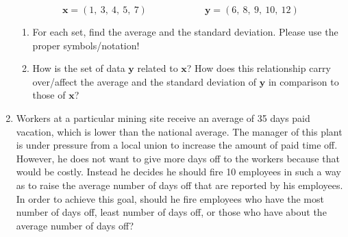 \documentclass[
  letterpaper,
  DIV=11,
  numbers=noendperiod]{scrartcl}
\begin{document}
\begin{enumerate}
  \[\mathbf{x} =  (1, \ 3,\ 4, \ 5,\  7) \qquad \qquad \qquad  \mathbf{y} =  (6,\ 8,\ 9,\ 10,\ 12)\]

  \begin{enumerate}
  \def\labelenumii{\alph{enumii}.}
  \item
    For each set, find the average and the standard deviation. Please
    use the proper symbols/notation!
  \item
    How is the set of data \(\mathbf{y}\) related to \(\mathbf{x}\)? How
    does this relationship carry over/affect the average and the
    standard deviation of \(\mathbf{y}\) in comparison to those of
    \(\mathbf{x}\)?
  \end{enumerate}
\item
  Workers at a particular mining site receive an average of 35 days paid
  vacation, which is lower than the national average. The manager of
  this plant is under pressure from a local union to increase the amount
  of paid time off. However, he does not want to give more days off to
  the workers because that would be costly. Instead he decides he should
  fire 10 employees in such a way as to raise the average number of days
  off that are reported by his employees. In order to achieve this goal,
  should he fire employees who have the most number of days off, least
  number of days off, or those who have about the average number of days
  off?
\end{enumerate}
\end{document}
